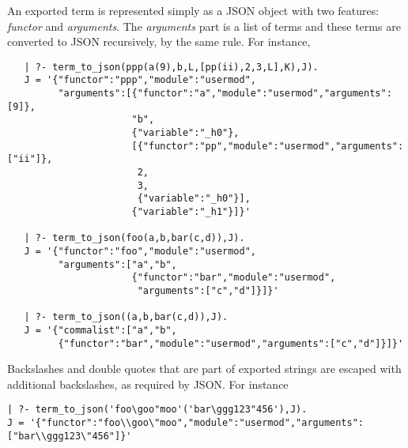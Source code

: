 An exported term is represented simply as a JSON object
with two features: \emph{functor} and \emph{arguments}. 
The \emph{arguments} part is a list of terms and these terms are converted
to JSON recursively, by the same rule. For instance,
\begin{verbatim}
   | ?- term_to_json(ppp(a(9),b,L,[pp(ii),2,3,L],K),J).
   J = '{"functor":"ppp","module":"usermod",
         "arguments":[{"functor":"a","module":"usermod","arguments":[9]},
                      "b",
                      {"variable":"_h0"},
                      [{"functor":"pp","module":"usermod","arguments":["ii"]},
                       2,
                       3,
                       {"variable":"_h0"}],
                      {"variable":"_h1"}]}'

   | ?- term_to_json(foo(a,b,bar(c,d)),J).
   J = '{"functor":"foo","module":"usermod",
         "arguments":["a","b",
                      {"functor":"bar","module":"usermod",
                       "arguments":["c","d"]}]}'

   | ?- term_to_json((a,b,bar(c,d)),J).
   J = '{"commalist":["a","b",
         {"functor":"bar","module":"usermod","arguments":["c","d"]}]}'
\end{verbatim}
Backslashes and double quotes that are part of exported strings are escaped
with additional backslashes, as required by JSON.
For instance
\begin{verbatim}
| ?- term_to_json('foo\goo"moo'('bar\ggg123"456'),J).
J = '{"functor":"foo\\goo\"moo","module":"usermod","arguments":["bar\\ggg123\"456"]}'
\end{verbatim}


